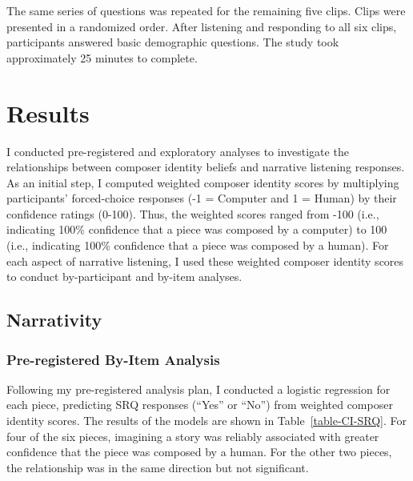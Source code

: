 \documentclass[12pt,twoside]{reedthesis}
\begin{document}
The same series of questions was repeated for the remaining five clips. Clips were presented in a randomized order. After listening and responding to all six clips, participants answered basic demographic questions. The study took approximately 25 minutes to complete. 

\section{Results}

I conducted pre-registered and exploratory analyses to investigate the relationships between composer identity beliefs and narrative listening responses. As an initial step, I computed weighted composer identity scores by multiplying participants’ forced-choice responses (-1 = Computer and 1 = Human) by their confidence ratings (0-100). Thus, the weighted scores ranged from -100 (i.e., indicating 100\% confidence that a piece was composed by a computer) to 100 (i.e., indicating 100\% confidence that a piece was composed by a human). For each aspect of narrative listening, I used these weighted composer identity scores to conduct by-participant and by-item analyses. 

\subsection{Narrativity}
\subsubsection{Pre-registered By-Item Analysis}
Following my pre-registered analysis plan, I conducted a logistic regression for each piece, predicting SRQ responses (“Yes” or “No”) from weighted composer identity scores. The results of the models are shown in Table~\ref*{table-CI-SRQ}. For four of the six pieces, imagining a story was reliably associated with greater confidence that the piece was composed by a human. For the other two pieces, the relationship was in the same direction but not significant.
\end{document}
